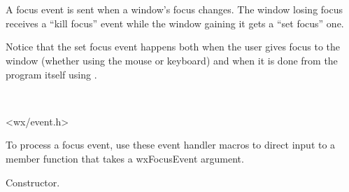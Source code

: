 \section{}\label{wxfocusevent}

A focus event is sent when a window's focus changes. The window losing focus
receives a ``kill focus'' event while the window gaining it gets a ``set
focus'' one.

Notice that the set focus event happens both when the user gives focus to the
window (whether using the mouse or keyboard) and when it is done from the
program itself using .


\\


<wx/event.h>


To process a focus event, use these event handler macros to direct input to a member
function that takes a wxFocusEvent argument.

\twocolwidtha{7cm}
\begin{twocollist}\itemsep=0pt
\end{twocollist}%




\label{wxfocuseventctor}


Constructor.

